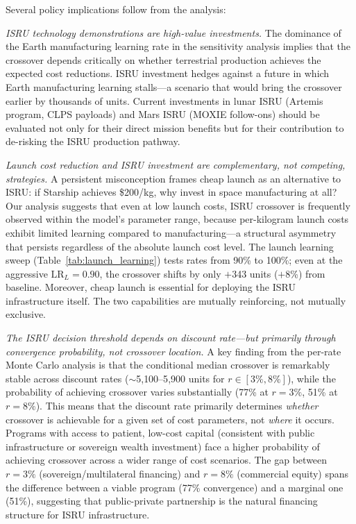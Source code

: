 \documentclass[preprint,12pt]{elsarticle}
\begin{document}
Several policy implications follow from the analysis:

\emph{ISRU technology demonstrations are high-value investments.} The dominance of the Earth manufacturing learning rate in the sensitivity analysis implies that the crossover depends critically on whether terrestrial production achieves the expected cost reductions. ISRU investment hedges against a future in which Earth manufacturing learning stalls---a scenario that would bring the crossover earlier by thousands of units. Current investments in lunar ISRU (Artemis program, CLPS payloads) and Mars ISRU (MOXIE follow-ons) should be evaluated not only for their direct mission benefits but for their contribution to de-risking the ISRU production pathway.

\emph{Launch cost reduction and ISRU investment are complementary, not competing, strategies.} A persistent misconception frames cheap launch as an alternative to ISRU: if Starship achieves \$200/kg, why invest in space manufacturing at all? Our analysis suggests that even at low launch costs, ISRU crossover is frequently observed within the model's parameter range, because per-kilogram launch costs exhibit limited learning compared to manufacturing---a structural asymmetry that persists regardless of the absolute launch cost level. The launch learning sweep (Table~\ref{tab:launch_learning}) tests rates from 90\% to 100\%; even at the aggressive $\mathrm{LR}_L = 0.90$, the crossover shifts by only $+$343 units ($+$8\%) from baseline. Moreover, cheap launch is essential for deploying the ISRU infrastructure itself. The two capabilities are mutually reinforcing, not mutually exclusive.

\emph{The ISRU decision threshold depends on discount rate---but primarily through convergence probability, not crossover location.} A key finding from the per-rate Monte Carlo analysis is that the conditional median crossover is remarkably stable across discount rates ($\sim$5{,}100--5{,}900 units for $r \in [3\%, 8\%]$), while the probability of achieving crossover varies substantially (77\% at $r = 3\%$, 51\% at $r = 8\%$). This means that the discount rate primarily determines \emph{whether} crossover is achievable for a given set of cost parameters, not \emph{where} it occurs. Programs with access to patient, low-cost capital (consistent with public infrastructure or sovereign wealth investment) face a higher probability of achieving crossover across a wider range of cost scenarios. The gap between $r = 3\%$ (sovereign/multilateral financing) and $r = 8\%$ (commercial equity) spans the difference between a viable program (77\% convergence) and a marginal one (51\%), suggesting that public-private partnership is the natural financing structure for ISRU infrastructure.
\end{document}
